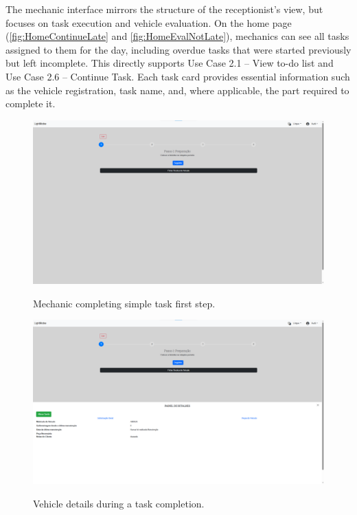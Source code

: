 The mechanic interface mirrors the structure of the receptionist's view, but focuses on task execution and vehicle evaluation. On the home page (\ref{fig:HomeContinueLate} and \ref{fig:HomeEvalNotLate}), mechanics can see all tasks assigned to them for the day, including overdue tasks that were started previously but left incomplete. This directly supports Use Case 2.1 – View to-do list and Use Case 2.6 – Continue Task. Each task card provides essential information such as the vehicle registration, task name, and, where applicable, the part required to complete it.


\begin{figure}[h]
  \caption{Mechanic completing simple task first step.}
  \centering
  \includegraphics[width=\textwidth]{figs/Implementation/mechanic/MechanicTaskNormal}
  \label{fig:MechanicTaskNormal}
\end{figure}

\begin{figure}[h]
  \caption{Vehicle details during a task completion.}
  \centering
  \includegraphics[width=\textwidth]{figs/Implementation/mechanic/MechanicTaskVehicleDetails}
  \label{fig:MechanicTaskVehicleDetails}
\end{figure}


